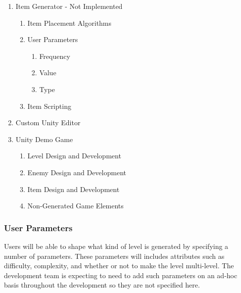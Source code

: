 \documentclass[pdftex,12pt,letter]{article}
\begin{document}
\begin{enumerate}
\item{Item Generator - Not Implemented}
\begin{enumerate}
\item Item Placement Algorithms
\item User Parameters
\begin{enumerate}
\item Frequency
\item Value
\item Type
\end{enumerate}
\item Item Scripting
\end{enumerate}

\item{Custom Unity Editor}

\item{Unity Demo Game}
\begin{enumerate}
\item Level Design and Development
\item Enemy Design and Development
\item Item Design and Development
\item Non-Generated Game Elements
\end{enumerate}
\end{enumerate}

\subsubsection{User Parameters}
Users will be able to shape what kind of level is generated by specifying a number of parameters. These parameters will includes attributes such as difficulty, complexity, and whether or not to make the level multi-level. The development team is expecting to need to add such parameters on an ad-hoc basis throughout the development so they are not specified here.
\end{document}
